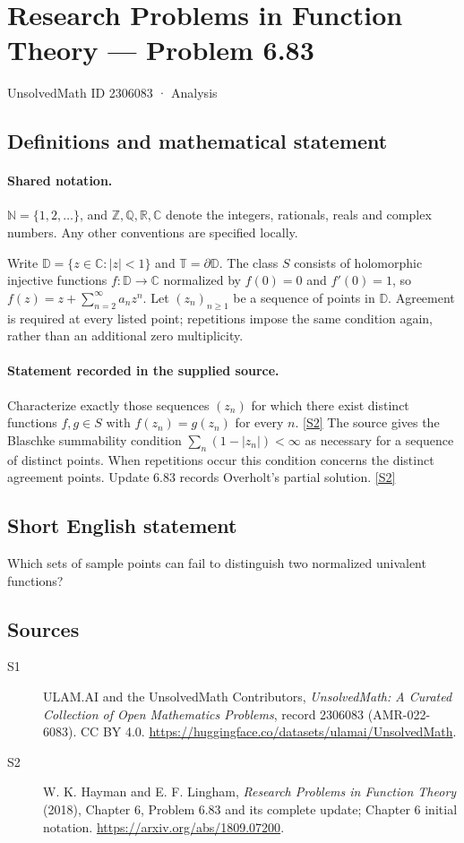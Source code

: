 \documentclass[11pt]{article}
\newcommand{\sref}[2]{\hyperlink{source:#1:#2}{[S#2]}}
\begin{document}
\setcounter{section}{2306082}
\section{Research Problems in Function Theory — Problem 6.83}\label{2306083}
{\small\sffamily UnsolvedMath ID 2306083 · Analysis}
\subsection{Definitions and mathematical statement}

\paragraph{Shared notation.}$\mathbb N=\{1,2,\ldots\}$, and $\mathbb Z,\mathbb Q,\mathbb R,\mathbb C$ denote the integers, rationals, reals and complex numbers. Any other conventions are specified locally.


Write $\mathbb D=\{z\in\mathbb C:|z|<1\}$ and $\mathbb T=\partial\mathbb D$. The class $S$ consists of holomorphic injective functions $f:\mathbb D\to\mathbb C$ normalized by $f(0)=0$ and $f'(0)=1$, so $f(z)=z+\sum_{n=2}^{\infty}a_nz^n$. Let $(z_n)_{n\ge1}$ be a sequence of points in $\mathbb D$. Agreement is required at every listed point; repetitions impose the same condition again, rather than an additional zero multiplicity.
\paragraph{Statement recorded in the supplied source.}
Characterize exactly those sequences $(z_n)$ for which there exist distinct functions $f,g\in S$ with $f(z_n)=g(z_n)$ for every $n$. \sref{2306083}{2}
The source gives the Blaschke summability condition $\sum_n(1-|z_n|)<\infty$ as necessary for a sequence of distinct points. When repetitions occur this condition concerns the distinct agreement points. Update 6.83 records Overholt's partial solution. \sref{2306083}{2}
\subsection{Short English statement}
Which sets of sample points can fail to distinguish two normalized univalent functions?
\subsection{Sources}
\begin{description}
\item[\hypertarget{source:2306083:1}{S1}] ULAM.AI and the UnsolvedMath Contributors, \emph{UnsolvedMath: A Curated Collection of Open Mathematics Problems}, record 2306083 (AMR-022-6083). CC BY 4.0. \url{https://huggingface.co/datasets/ulamai/UnsolvedMath}.
\item[\hypertarget{source:2306083:2}{S2}] W. K. Hayman and E. F. Lingham, \emph{Research Problems in Function Theory} (2018), Chapter 6, Problem 6.83 and its complete update; Chapter 6 initial notation. \url{https://arxiv.org/abs/1809.07200}.
\end{description}
\label{end:2306083}
\end{document}
